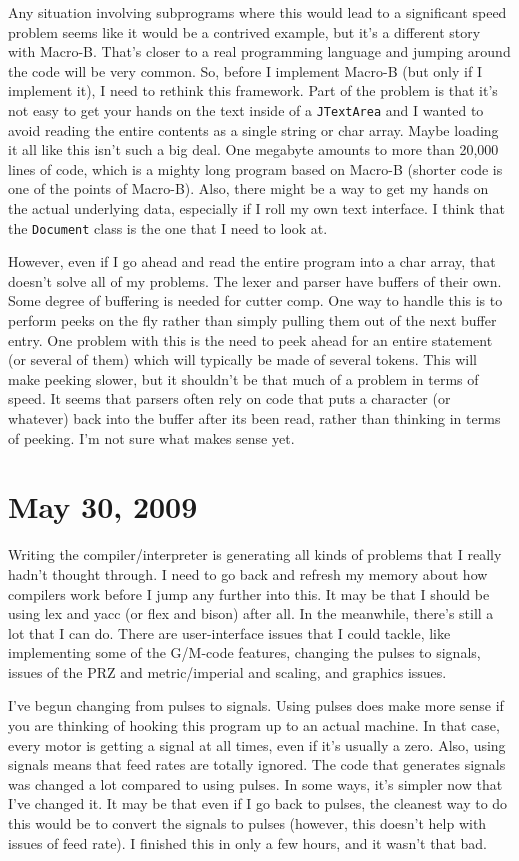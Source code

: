 \documentclass[titlepage,oneside,10pt]{article}
\begin{document}
Any situation involving subprograms where this would lead
to a significant speed problem seems like it would be a contrived
example, but it's a different story with Macro-B. That's closer to a
real programming language and jumping around the code will be very
common. So, before I implement Macro-B (but only if I implement it), I need to
rethink this framework. Part of the problem is that it's not easy to
get your hands on the text inside of a {\tt JTextArea} and I wanted to
avoid reading the entire contents as a single string or char
array. Maybe loading it all like this isn't such a big deal. One
megabyte amounts to more than 20,000 lines of code, which is a mighty
long program based on Macro-B (shorter code is one of the points of
Macro-B). Also, there might be a way to get my hands on the actual
underlying data, especially if I roll my own text interface. I think
that the {\tt Document} class is the one that I need to look at.

However, even if I go ahead and read the entire program into a char
array, that doesn't solve all of my problems. The lexer and parser
have buffers of their own. Some degree of buffering is needed for
cutter comp. One way to handle this is to perform peeks on the fly
rather than simply pulling them out of the next buffer entry. One
problem with this is the need to peek ahead for an entire statement
(or several of them) which will typically be made of several
tokens. This will make peeking slower, but it shouldn't be that much
of a problem in terms of speed. It seems that parsers often rely on
code that puts a character (or whatever) back into the buffer after
its been read, rather than thinking in terms of peeking. I'm not sure
what makes sense yet.

\section{May 30, 2009}

Writing the compiler/interpreter is generating all kinds of problems
that I really hadn't thought through. I need to go back and refresh my
memory about how compilers work before I jump any further into
this. It may be that I should be using lex and yacc (or flex and
bison) after all. In the meanwhile, there's still a lot that I can
do. There are user-interface issues that I could tackle, like
implementing some of the G/M-code features, changing the pulses to
signals, issues of the PRZ and metric/imperial and scaling, and
graphics issues.

I've begun changing from pulses to signals. Using pulses does make
more sense if you are thinking of hooking this program up to an
actual machine. In that case, every motor is getting a signal at all
times, even if it's usually a zero. Also, using signals means that
feed rates are totally ignored. The code that generates signals was
changed a lot compared to using pulses. In some ways, it's simpler now
that I've changed it. It may be that even if I go back to pulses, the
cleanest way to do this would be to convert the signals to pulses
(however, this doesn't help with issues of feed rate). I finished this
in only a few hours, and it wasn't that bad. 
\end{document}
